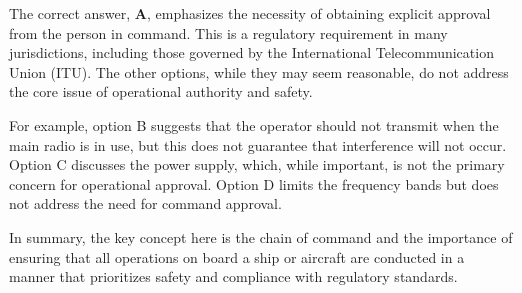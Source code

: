 The correct answer, \textbf{A}, emphasizes the necessity of obtaining explicit approval from the person in command. This is a regulatory requirement in many jurisdictions, including those governed by the International Telecommunication Union (ITU). The other options, while they may seem reasonable, do not address the core issue of operational authority and safety.

For example, option B suggests that the operator should not transmit when the main radio is in use, but this does not guarantee that interference will not occur. Option C discusses the power supply, which, while important, is not the primary concern for operational approval. Option D limits the frequency bands but does not address the need for command approval.

In summary, the key concept here is the chain of command and the importance of ensuring that all operations on board a ship or aircraft are conducted in a manner that prioritizes safety and compliance with regulatory standards.

